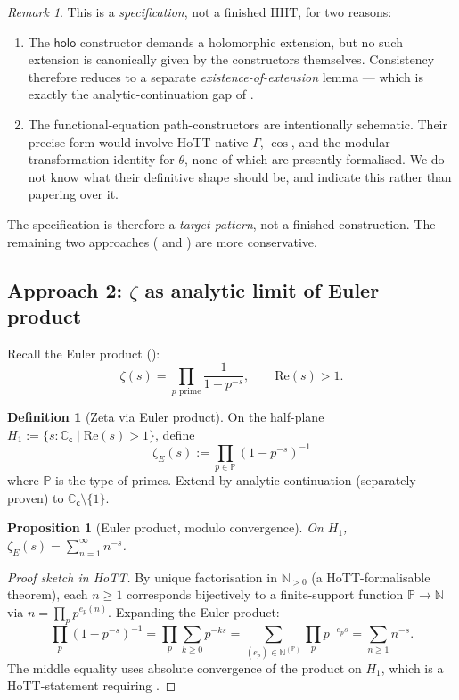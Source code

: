 \documentclass[12pt]{article}
\newtheorem{proposition}[theorem]{Proposition}
\theoremstyle{definition}
\newtheorem{definition}[theorem]{Definition}
\theoremstyle{remark}
\newtheorem{remark}[theorem]{Remark}
\newcommand{\C}{\mathbb{C}}
\newcommand{\N}{\mathbb{N}}
\newcommand{\Cc}{\C_{\mathsf{c}}}
\begin{document}
\begin{remark}\label{rem:ZetaHIITissues}
This is a \emph{specification}, not a finished HIIT, for two reasons:
\begin{enumerate}
\item The $\mathsf{holo}$ constructor demands a holomorphic extension, but no
such extension is canonically given by the constructors themselves.
Consistency therefore reduces to a separate \emph{existence-of-extension}
lemma — which is exactly the analytic-continuation gap of .
\item The functional-equation path-constructors are intentionally schematic.
Their precise form would involve HoTT-native $\Gamma$, $\cos$, and the
modular-transformation identity for $\theta$, none of which are presently
formalised. We do not know what their definitive shape should be, and
indicate this rather than papering over it.
\end{enumerate}
The specification is therefore a \emph{target pattern}, not a finished
construction. The remaining two approaches ( and
) are more conservative.
\end{remark}

\subsection{Approach 2: \texorpdfstring{$\zeta$}{zeta} as analytic limit of Euler product}

Recall the Euler product (\cite{Euler1737}):
\[
\zeta(s) = \prod_{p \text{ prime}} \frac{1}{1 - p^{-s}}, \qquad \mathrm{Re}(s) > 1.
\]

\begin{definition}[Zeta via Euler product]\label{def:ZetaEuler}
On the half-plane $H_1 := \{s:\Cc \mid \mathrm{Re}(s) > 1\}$, define
\[
\zeta_E(s) := \prod_{p \in \mathbb{P}} (1 - p^{-s})^{-1}
\]
where $\mathbb{P}$ is the type of primes. Extend by analytic continuation
(separately proven) to $\Cc \setminus \{1\}$.
\end{definition}

\begin{proposition}[Euler product, modulo convergence]\label{prop:Euler}
On $H_1$, $\zeta_E(s) = \sum_{n=1}^{\infty} n^{-s}$.
\end{proposition}

\begin{proof}[Proof sketch in HoTT]
By unique factorisation in $\N_{>0}$ (a HoTT-formalisable theorem), each
$n \geq 1$ corresponds bijectively to a finite-support function $\mathbb{P}
\to \N$ via $n = \prod_p p^{e_p(n)}$. Expanding the Euler product:
\[
\prod_p (1 - p^{-s})^{-1}
  = \prod_p \sum_{k \geq 0} p^{-ks}
  = \sum_{(e_p)\in \N^{(\mathbb{P})}} \prod_p p^{-e_p s}
  = \sum_{n \geq 1} n^{-s}.
\]
The middle equality uses absolute convergence of the product on $H_1$, which
is a HoTT-statement requiring .
\end{proof}
\end{document}

